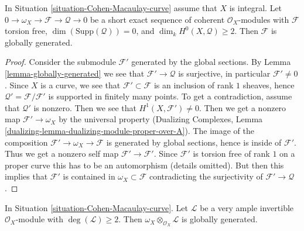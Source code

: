 \begin{lemma}
\label{lemma-globally-generated-curve}
In Situation \ref{situation-Cohen-Macaulay-curve} assume that
$X$ is integral. Let $0 \to \omega_X \to \mathcal{F} \to \mathcal{Q} \to 0$
be a short exact sequence of coherent $\mathcal{O}_X$-modules with
$\mathcal{F}$ torsion free, $\dim(\text{Supp}(\mathcal{Q})) = 0$,
and $\dim_k H^0(X, \mathcal{Q}) \geq 2$. Then $\mathcal{F}$
is globally generated.
\end{lemma}

\begin{proof}
Consider the submodule $\mathcal{F}'$ generated by the global sections. By
Lemma \ref{lemma-globally-generated} we see that $\mathcal{F}' \to \mathcal{Q}$
is surjective, in particular $\mathcal{F}' \not = 0$. Since $X$ is a curve, we
see that $\mathcal{F}' \subset \mathcal{F}$ is an inclusion of rank $1$
sheaves, hence $\mathcal{Q}' = \mathcal{F}/\mathcal{F}'$ is supported in
finitely many points. To get a contradiction, assume that
$\mathcal{Q}'$ is nonzero. Then we see that $H^1(X, \mathcal{F}') \not = 0$.
Then we get a nonzero map $\mathcal{F}' \to \omega_X$ by the universal
property (Dualizing Complexes, Lemma
\ref{dualizing-lemma-dualizing-module-proper-over-A}).
The image of the composition $\mathcal{F}' \to \omega_X \to \mathcal{F}$
is generated by global sections, hence is inside of $\mathcal{F}'$.
Thus we get a nonzero self map $\mathcal{F}' \to \mathcal{F}'$.
Since $\mathcal{F}'$ is torsion free of rank $1$ on a proper curve
this has to be an automorphism (details omitted). But then this implies that
$\mathcal{F}'$ is contained in $\omega_X \subset \mathcal{F}$
contradicting the surjectivity of $\mathcal{F}' \to \mathcal{Q}$.
\end{proof}

\begin{lemma}
\label{lemma-tensor-omega-with-globally-generated-invertible}
In Situation \ref{situation-Cohen-Macaulay-curve}. Let $\mathcal{L}$
be a very ample invertible $\mathcal{O}_X$-module with
$\deg(\mathcal{L}) \geq 2$. Then
$\omega_X \otimes_{\mathcal{O}_X} \mathcal{L}$ is globally generated.
\end{lemma}

